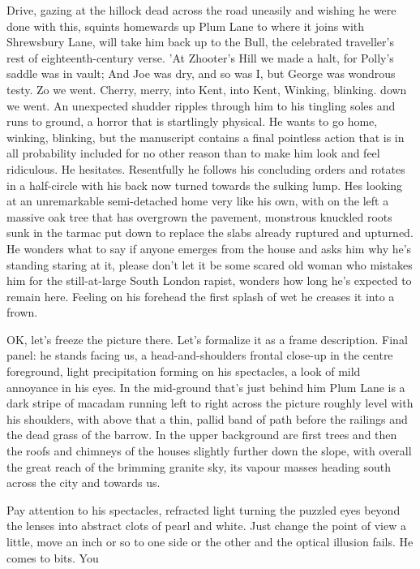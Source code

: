 \documentclass[
]{article}
\begin{document}
Drive, gazing at the hillock dead across the road uneasily and wishing
he were done with this, squints homewards up Plum Lane to where it joins
with Shrewsbury Lane, will take him back up to the Bull, the celebrated
traveller's rest of eighteenth-century verse. 'At Zhooter's Hill we made
a halt, for Polly's saddle was in vault; And Joe was dry, and so was I,
but George was wondrous testy. Zo we went. Cherry, merry, into Kent,
into Kent, Winking, blinking. down we went. An unexpected shudder
ripples through him to his tingling soles and runs to ground, a horror
that is startlingly physical. He wants to go home, winking, blinking,
but the manuscript contains a final pointless action that is in all
probability included for no other reason than to make him look and feel
ridiculous. He hesitates. Resentfully he follows his concluding orders
and rotates in a half-circle with his back now turned towards the
sulking lump. Hes looking at an unremarkable semi-detached home very
like his own, with on the left a massive oak tree that has overgrown the
pavement, monstrous knuckled roots sunk in the tarmac put down to
replace the slabs already ruptured and upturned. He wonders what to say
if anyone emerges from the house and asks him why he's standing staring
at it, please don't let it be some scared old woman who mistakes him for
the still-at-large South London rapist, wonders how long he's expected
to remain here. Feeling on his forehead the first splash of wet he
creases it into a frown. \par
OK, let's freeze the picture there. Let's formalize it as a frame
description. Final panel: he stands facing us, a head-and-shoulders
frontal close-up in the centre foreground, light precipitation forming
on his spectacles, a look of mild annoyance in his eyes. In the
mid-ground that's just behind him Plum Lane is a dark stripe of macadam
running left to right across the picture roughly level with his
shoulders, with above that a thin, pallid band of path before the
railings and the dead grass of the barrow. In the upper background are
first trees and then the roofs and chimneys of the houses slightly
further down the slope, with overall the great reach of the brimming
granite sky, its vapour masses heading south across the city and towards
us. \par
Pay attention to his spectacles, refracted light turning the
puzzled eyes beyond the lenses into abstract clots of pearl and white.
Just change the point of view a little, move an inch or so to one side
or the other and the optical illusion fails. He comes to bits. You
\end{document}
